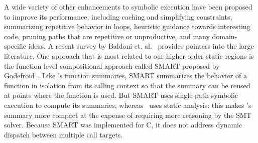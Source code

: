 A wide variety of other enhancements to symbolic execution have been
proposed to improve its performance, including caching and simplifying
constraints, summarizing repetitive behavior in loops, heuristic
guidance towards interesting code, pruning paths that are repetitive
or unproductive, and many domain-specific ideas.
%
A recent survey by Baldoni et. al.~\cite{SurveySymExec-CSUR18}
provides pointers into the large literature.
%
One approach that is most related to our higher-order static regions
is the function-level compositional approach called SMART proposed by
Godefroid~\cite{Godefroid2007}.
%
Like \tool's function summaries, SMART summarizes the behavior of a
function in isolation from its calling context so that the summary can
be reused at points where the function is used.
%
But SMART uses single-path symbolic execution to compute its
summaries, whereas \tool\ uses static analysis: this makes \tool's
summary more compact at the expense of requiring more reasoning by the
SMT solver.
%
Because SMART was implemented for C, it does not address dynamic
dispatch between multiple call targets.


%

%
%
%
%
